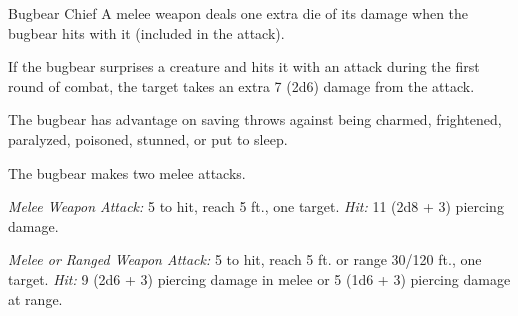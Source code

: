 \documentclass[10pt,a4paper,twoside,bg=print,twocolumn,openany,nodeprecatedcode]{dndbook}
\begin{document}
\begin{DndMonster}[float=t]{Bugbear Chief}
\DndMonsterBasics[
armor-class = {17 (\textit{chain shirt})},
hit-points = {\DndDice{10d8 + 20}},
speed = {30 ft.}
]
\DndMonsterAbilityScores[
 str = 17,
 dex = 14,
 con = 14,
 int = 11,
 wis = 12,
 cha = 11
]
\DndMonsterDetails[
skills = {Intimidation +2, Stealth +6, Survival +3},
senses = {darkvision 60 ft., passive perception 11},
languages = {Common, Goblin},
challenge = 3,
]
A melee weapon deals one extra die of its damage when the bugbear hits with it (included in the attack).

If the bugbear surprises a creature and hits it with an attack during the first round of combat, the target takes an extra 7 (2d6) damage from the attack.

The bugbear has advantage on saving throws against being charmed, frightened, paralyzed, poisoned, stunned, or put to sleep.

The bugbear makes two melee attacks.

\textsl{Melee Weapon Attack:} 5 to hit, reach 5 ft., one target. \textsl{Hit:} 11 (2d8 + 3) piercing damage.

\textsl{Melee or Ranged Weapon Attack:} 5 to hit, reach 5 ft. or range 30/120 ft., one target. \textsl{Hit:} 9 (2d6 + 3) piercing damage in melee or 5 (1d6 + 3) piercing damage at range.

\end{DndMonster}
\end{document}
